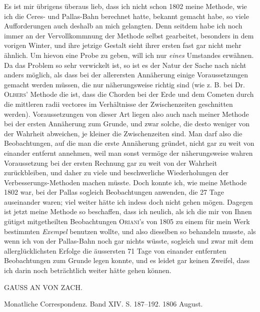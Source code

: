 \par\indent Es ist mir übrigens überaus lieb, dass ich nicht schon 1802 meine Methode, wie ich die Ceres- und Pallas-Bahn berechnet hatte, bekannt gemacht habe, so viele Aufforderungen auch deshalb an mich gelangten. Denn seitdem habe ich noch immer an der Vervollkommnung der Methode selbst gearbeitet, besonders in dem vorigen Winter, und ihre jetzige Gestalt sieht ihrer ersten fast gar nicht mehr ähnlich. Um hievon eine Probe zu geben, will ich nur \emph{eines} Umstandes erwähnen. Da das Problem so sehr verwickelt ist, so ist es der Natur der Sache nach nicht anders möglich, als dass bei der allerersten Annäherung einige Voraussetzungen gemacht werden müssen, die nur näherungsweise richtig sind (wie z. B. bei Dr. \textsc{Olbers}' Methode die ist, dass die Chorden bei der Erde und dem Cometen durch die mittleren radii vectores im Verhältnisse der Zwischenzeiten geschnitten werden). Voraussetzungen von dieser Art liegen also auch nach meiner Methode bei der ersten Annäherung zum Grunde, und zwar solche, die desto weniger von der Wahrheit abweichen, je kleiner die Zwischenzeiten sind. Man darf also die Beobachtungen, auf die man die erste Annäherung gründet, nicht gar zu weit von einander entfernt annehmen, weil man sonst vermöge der näherungsweise wahren Voraussetzung bei der ersten Rechnung gar zu weit von der Wahrheit zurückbleiben, und daher zu viele und beschwerliche Wiederholungen der Verbesserungs-Methoden machen müsste. Doch konnte ich, wie meine Methode 1802 war, bei der Pallas sogleich Beobachtungen anwenden, die 27 Tage auseinander waren; viel weiter hätte ich indess doch nicht gehen mögen. Dagegen ist jetzt meine Methode so beschaffen, dass ich neulich, als ich die mir von Ihnen gütigst mitgetheilten Beobachtungen \textsc{Oriani}'s von 1805 zu einem für mein Werk
%
bestimmten \emph{Exempel} benutzen wollte, und also dieselben so behandeln musste, als wenn ich von der
Pallas-Bahn noch gar nichts wüsste, sogleich und zwar mit dem allerglücklichsten Erfolge die äussersten
71 Tage von einander entfernten Beobachtungen zum Grunde legen konnte, und es leidet gar keinen
Zweifel, dass ich darin noch beträchtlich weiter hätte gehen können.

\begin{center}
GAUSS AN VON ZACH.
\end{center}

\begin{center}
Monatliche Correspondenz. Band XIV. S. 187–192. 1806 August.
\end{center}

